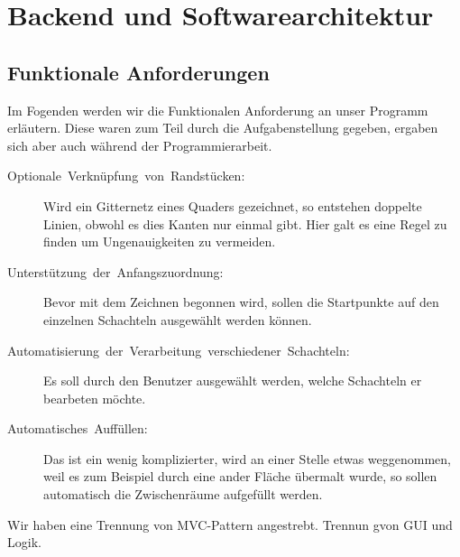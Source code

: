 \section{Backend und Softwarearchitektur}
\label{sec:backend}

\subsection{Funktionale Anforderungen}
\label{subsec:anforderungen}

Im Fogenden werden wir die Funktionalen Anforderung an unser Programm erläutern. Diese waren zum Teil durch die Aufgabenstellung gegeben, ergaben sich aber auch während der Programmierarbeit.

  \begin{description}
    \item [{Optionale~Verknüpfung~von~Randstücken:}] Wird ein Gitternetz     eines Quaders gezeichnet, so entstehen doppelte Linien, obwohl es dies Kanten nur einmal gibt. Hier galt es eine Regel zu finden um Ungenauigkeiten zu vermeiden.
    \item [{Unterstützung~der~Anfangszuordnung:}] Bevor mit dem Zeichnen begonnen wird, sollen die Startpunkte auf den einzelnen Schachteln ausgewählt werden können.
    \item [{Automatisierung~der~Verarbeitung~verschiedener~Schachteln:}] Es soll durch den Benutzer ausgewählt werden, welche Schachteln er bearbeten
    möchte.
    \item [{Automatisches~Auffüllen:}] Das ist ein wenig komplizierter, wird an einer Stelle etwas weggenommen, weil es zum Beispiel durch eine ander Fläche übermalt wurde, so sollen automatisch die Zwischenräume aufgefüllt werden.
  \end{description}

Wir haben eine Trennung von MVC-Pattern angestrebt. Trennun gvon GUI
und Logik.\\


